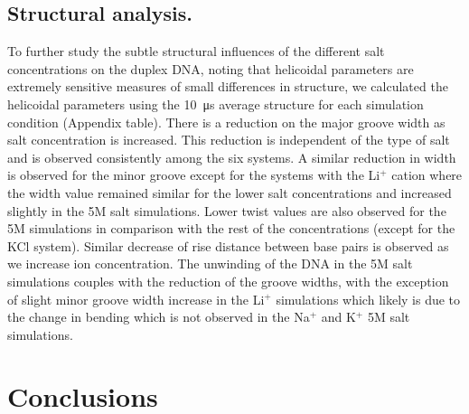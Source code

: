 \documentclass[9pt,lessons]{livecoms}
\begin{document}
\subsection{Structural analysis.}

To further study the subtle structural influences of the different
salt concentrations on the duplex DNA, noting that helicoidal
parameters are extremely sensitive measures of small differences in
structure, we calculated the helicoidal parameters using the
\SI{10}{\micro\second} average structure for each simulation condition
(Appendix table). There is a reduction on the major groove width as
salt concentration is increased. This reduction is independent of the
type of salt and is observed consistently among the six systems. A
similar reduction in width is observed for the minor groove except for
the systems with the Li$^{+}$ cation where the width value remained
similar for the lower salt concentrations and increased slightly in
the 5M salt simulations. Lower twist values are also observed for the
5M simulations in comparison with the rest of the concentrations
(except for the KCl system). Similar decrease of rise distance between
base pairs is observed as we increase ion concentration. The unwinding
of the DNA in the 5M salt simulations couples with the reduction of
the groove widths, with the exception of slight minor groove width
increase in the Li$^{+}$ simulations which likely is due to the change
in bending which is not observed in the Na$^{+}$ and K$^{+}$ 5M salt
simulations.


\section{Conclusions}
\end{document}
